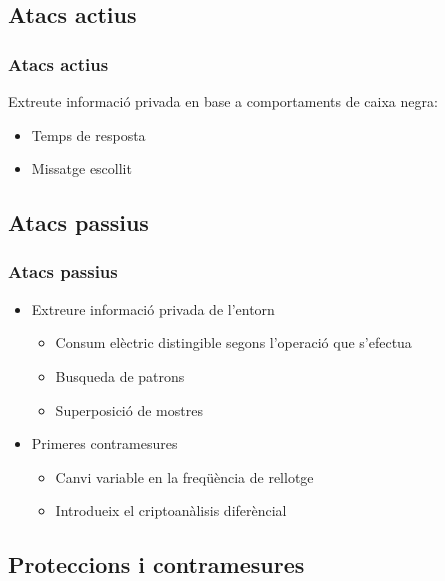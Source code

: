 \documentclass{beamer}
\theoremstyle{saltolinea}   			%
\begin{document}
\subsection{Atacs actius}

\begin{frame}
  \frametitle{Atacs actius}
  Extreute informaci\'o privada en base a comportaments de caixa negra:
  \begin{itemize}
    \item<2-> Temps de resposta
    \item<3-> Missatge escollit
  \end{itemize}
\end{frame}

\subsection{Atacs passius}

\begin{frame}
  \frametitle{Atacs passius}
  \begin{itemize}
    \item<2-> Extreure informaci\'o privada de l'entorn
    \begin{itemize}
      \item<3-> Consum el\`ectric distingible segons l'operaci\'o que s'efectua
      \item<4-> Busqueda de patrons
      \item<5-> Superposici\'o de mostres
    \end{itemize}
    \item<6-> Primeres contramesures
    \begin{itemize}
      \item<7-> Canvi variable en la freq\"u\`encia de rellotge
      \item<8-> Introdueix el criptoan\`alisis difer\`encial
    \end{itemize}
  \end{itemize}
\end{frame}

\subsection{Proteccions i contramesures}
\end{document}
